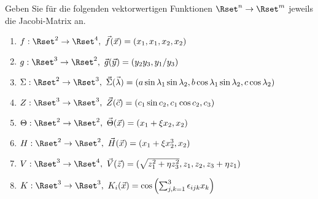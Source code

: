 Geben Sie für die folgenden vektorwertigen Funktionen $\Rset^n\to\Rset^m$ jeweils die Jacobi-Matrix an. %
\begin{enumerate}
\item $f:\Rset^2\to\Rset^4,~\vec{f}(\vec{x})=(x_1,x_1,x_2,x_2)$
\item $g:\Rset^3\to\Rset^2,~\vec{g}(\vec{y})=(y_2y_3,y_1/y_3)$
\item $\Sigma:\Rset^2\to\Rset^3,~\vec{\Sigma}(\vec{\lambda})=(a\sin\lambda_1\sin\lambda_2,b\cos\lambda_1\sin\lambda_2,c\cos\lambda_2)$
\item $Z:\Rset^3\to\Rset^3,~\vec{Z}(\vec{c})=(c_1\sin c_2,c_1\cos c_2,c_3)$
\item $\Theta:\Rset^2\to\Rset^2,~\vec{\Theta}(\vec{x})=(x_1+\xi x_2,x_2)$
\item $H:\Rset^2\to\Rset^2,~\vec{H}(\vec{x})=(x_1+\xi x_2^3,x_2)$
\item $V:\Rset^3\to\Rset^4,~\vec{V}(\vec{z})=(\sqrt{z_1^2+\eta z_3^2},z_1,z_2,z_3+\eta z_1)$
\item $K:\Rset^3\to\Rset^3,~K_i(\vec{x})=\cos\left(\sum_{j,k=1}^3\epsilon_{ijk}x_k\right)$
\end{enumerate}




%


